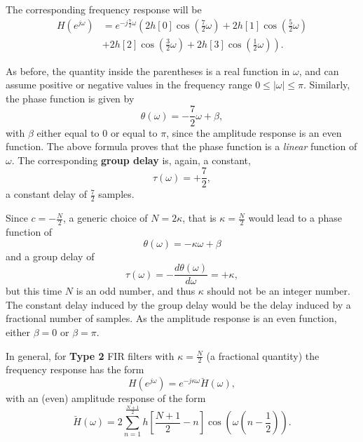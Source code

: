 \documentclass[\documentfontsize, twocolumn]{\classname}
\begin{document}
The corresponding frequency response will be
\begin{align*}
    H(e^{j\omega}) &= e^{-j\frac 7 2 \omega} \left(2h[0]\cos{(\frac 7 2 \omega)} + 2h[1] \cos{(\frac 5 2 \omega)}\right.\\
    &\left. + 2h[2]\cos{(\frac 3 2 \omega)} + 2h[3] \cos{(\frac 1 2 \omega)} \right).
\end{align*}

As before, the quantity inside the parentheses is a real function in $\omega$, and can assume positive or negative values in the frequency range $0 \leq |\omega| \leq \pi$. Similarly, the phase function is given by
\[
    \theta(\omega) = -\frac 7 2 \omega + \beta,
\]
with $\beta$ either equal to $0$ or equal to $\pi$, since the amplitude response is an even function. The above formula proves that the phase function is a \emph{linear} function of $\omega$. The corresponding \textbf{group delay} is, again, a constant,
\[
    \tau(\omega) = +\frac 7 2,
\]
a constant delay of $\frac 7 2$ samples.

Since $c=-\frac N 2$, a generic choice of $N = 2\kappa$, that is $\kappa = \frac N 2$ would lead to a phase function of 
\begin{equation}\label{eqn:linearPhaseTypeIIPhaseFunction}
    \theta(\omega) = -\kappa\omega + \beta
\end{equation}
and a group delay of
\begin{equation}\label{eqn:linearPhaseTypeIIGroupDelay}
    \tau(\omega) = -\frac{d\theta(\omega)}{d\omega} = +\kappa,
\end{equation}
but this time $N$ is an odd number, and thus $\kappa$ should not be an integer number. The constant delay induced by the group delay would be the delay induced by a fractional number of samples. As the amplitude response is an even function, either $\beta=0$ or $\beta=\pi$.

In general, for \textbf{Type 2} FIR filters with $\kappa = \frac N 2$ (a fractional quantity) the frequency response has the form
\begin{equation}\label{eqn:linearPhaseTypeIIResponse}
    H(e^{j\omega}) = e^{-j\kappa\omega}\breve{H}(\omega),
\end{equation}
with an (even) amplitude response of the form
\begin{equation}\label{eqn:linearPhaseTypeIIAmplitudeResponse}
    \breve{H}(\omega) = 2\sum_{n=1}^{\frac{N+1}{2}} h[\frac{N+1}{2} - n]\cos{(\omega (n - \frac 1 2))}.
\end{equation}
\end{document}
